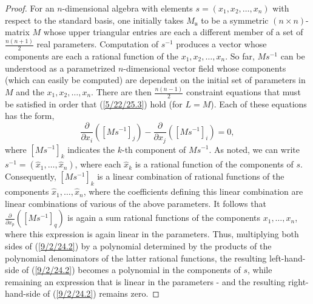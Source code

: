 \documentclass{amsart}
\theoremstyle{definition}
\numberwithin{theorem}{section}
\numberwithin{equation}{section}
\begin{document}
\begin{proof} For an $n$-dimensional algebra with elements $s = (x_1,x_2,\dots,x_n)$ with respect to the standard basis, one initially takes $M_\mathfrak{u}$ to be a symmetric $(n\times n)$-matrix $M$ whose upper triangular entries are each a different member of a set of $\frac{n(n+1)}{2}$ real parameters.  Computation of $s^{-1}$ produces a vector whose components are each a rational function of the $x_1,x_2,\dots,x_n$.  So far, $Ms^{-1}$ can be understood as a parametrized \mbox{$n$-dimensional} vector field whose components (which can easily be computed) are dependent on the initial set of parameters in $M$ and the $x_1,x_2,\dots,x_n$.  There are then $\frac{n(n-1)}{2}$ constraint equations that must be satisfied in order that (\ref{5/22/25.3}) hold (for $L=M$).  Each of these equations has the form, \begin{equation}\label{9/2/24.2} \frac{\partial}{\partial x_i}([Ms^{-1}]_j) - \frac{\partial}{\partial x_j}([Ms^{-1}]_i) = 0,\end{equation} where $[Ms^{-1}]_k$ indicates the $k$-th component of $Ms^{-1}$.  As noted, we can write $s^{-1} = (\hat{x}_1,\dots,\hat{x}_n)$, where each $\hat{x}_k$ is a rational function of the components of $s$.  Consequently, $[Ms^{-1}]_k$ is a linear combination of rational functions of the components $\hat{x}_1,\dots,\hat{x}_n$, where the coefficients defining this linear combination are linear combinations of various of the above parameters.  It follows that $\frac{\partial}{\partial x_p}([Ms^{-1}]_q)$ is again a sum rational functions of the components $x_1,\dots,x_n$, where this expression is again linear in the parameters.  Thus, multiplying both sides of (\ref{9/2/24.2}) by a polynomial determined by the products of the polynomial denominators of the latter rational functions, the resulting left-hand-side of (\ref{9/2/24.2}) becomes a polynomial in the components of $s$, while remaining an expression that is linear in the parameters - and the resulting right-hand-side of (\ref{9/2/24.2}) remains zero.

\end{proof}
\end{document}
